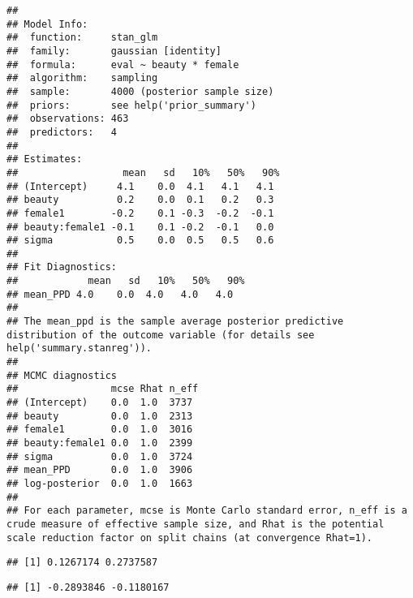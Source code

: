 \documentclass[
]{article}
\newenvironment{Shaded}{\begin{snugshade}}{\end{snugshade}}
\newcommand{\FunctionTok}[1]{\textcolor[rgb]{0.00,0.00,0.00}{#1}}
\newcommand{\NormalTok}[1]{#1}
\newcommand{\SpecialCharTok}[1]{\textcolor[rgb]{0.00,0.00,0.00}{#1}}
\begin{document}
\begin{verbatim}
## 
## Model Info:
##  function:     stan_glm
##  family:       gaussian [identity]
##  formula:      eval ~ beauty * female
##  algorithm:    sampling
##  sample:       4000 (posterior sample size)
##  priors:       see help('prior_summary')
##  observations: 463
##  predictors:   4
## 
## Estimates:
##                  mean   sd   10%   50%   90%
## (Intercept)     4.1    0.0  4.1   4.1   4.1 
## beauty          0.2    0.0  0.1   0.2   0.3 
## female1        -0.2    0.1 -0.3  -0.2  -0.1 
## beauty:female1 -0.1    0.1 -0.2  -0.1   0.0 
## sigma           0.5    0.0  0.5   0.5   0.6 
## 
## Fit Diagnostics:
##            mean   sd   10%   50%   90%
## mean_PPD 4.0    0.0  4.0   4.0   4.0  
## 
## The mean_ppd is the sample average posterior predictive distribution of the outcome variable (for details see help('summary.stanreg')).
## 
## MCMC diagnostics
##                mcse Rhat n_eff
## (Intercept)    0.0  1.0  3737 
## beauty         0.0  1.0  2313 
## female1        0.0  1.0  3016 
## beauty:female1 0.0  1.0  2399 
## sigma          0.0  1.0  3724 
## mean_PPD       0.0  1.0  3906 
## log-posterior  0.0  1.0  1663 
## 
## For each parameter, mcse is Monte Carlo standard error, n_eff is a crude measure of effective sample size, and Rhat is the potential scale reduction factor on split chains (at convergence Rhat=1).
\end{verbatim}

\begin{Shaded}
\end{Shaded}

\begin{verbatim}
## [1] 0.1267174 0.2737587
\end{verbatim}

\begin{Shaded}
\end{Shaded}

\begin{verbatim}
## [1] -0.2893846 -0.1180167
\end{verbatim}
\end{document}
